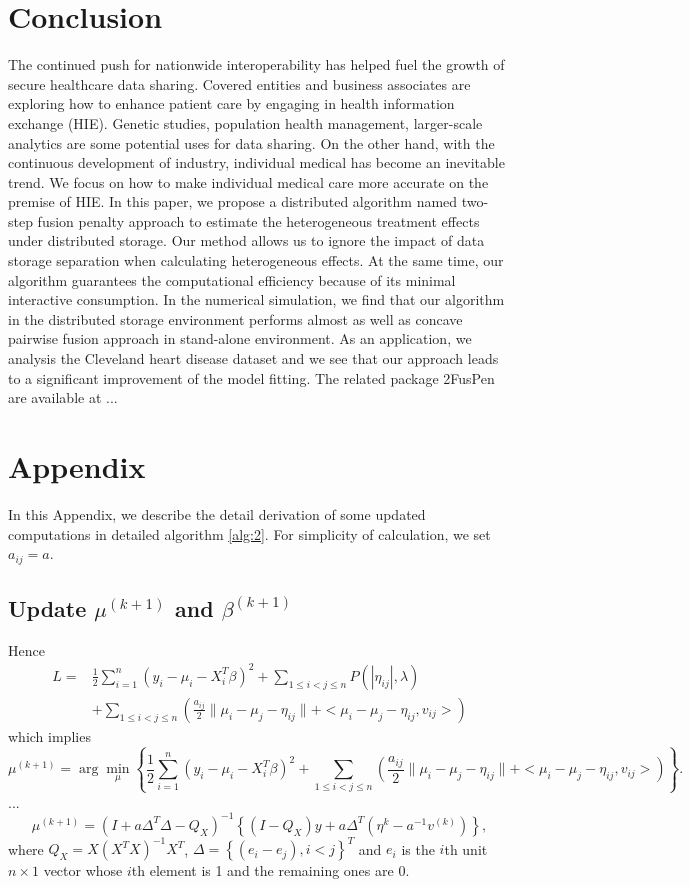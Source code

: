 \documentclass[review]{elsarticle}
\begin{document}
\section{Conclusion}
The continued push for nationwide interoperability has helped fuel the growth of secure healthcare data sharing. Covered entities and business associates are exploring how to enhance patient care by engaging in health information exchange (HIE). Genetic studies,  population health management, larger-scale analytics are some potential uses for data sharing. On the other hand, with the continuous development of industry, individual medical has become an inevitable trend. We focus on how to make individual medical care more accurate on the premise of HIE. In this paper, we propose a distributed algorithm named two-step fusion penalty approach to estimate the heterogeneous treatment effects under distributed storage. Our method allows us to ignore the impact of data storage separation when calculating heterogeneous effects. At the same time, our algorithm guarantees the computational efficiency because of its minimal interactive consumption. In the numerical simulation, we find that our algorithm in the distributed storage environment performs almost as well as concave pairwise fusion approach in stand-alone environment. As an application, we analysis the Cleveland heart disease dataset and we see that our approach leads to a significant improvement of the model fitting. The related package 2FusPen are available at ...
\section{Appendix}
In this Appendix, we describe the detail derivation of some updated computations in detailed algorithm \ref{alg:2}. For simplicity of calculation, we set $a_{ij}=a$.
\subsection{Update $\mu^{(k+1)}$ and $\beta^{(k+1)}$}
Hence 
$$
\begin{aligned}
L=&\frac{1}{2}\sum_{i=1}^n(y_i-\mu_i-X_i^T\beta)^2+\sum_{1\leq i<j\leq n}P(|\eta_{ij}|,\lambda)\\
&+\sum_{1\leq i<j\leq n}(\frac{a_{ij}}{2}\lVert \mu_i-\mu_j-\eta_{ij}\rVert+<\mu_i-\mu_j-\eta_{ij}, v_{ij}>)
\end{aligned}
$$
which implies
$$
\mu^{(k+1)}=\arg\min_{\mu}\left\{\frac{1}{2}\sum_{i=1}^n(y_i-\mu_i-X_i^T\beta)^2+\sum_{1\leq i<j\leq n}(\frac{a_{ij}}{2}\lVert \mu_i-\mu_j-\eta_{ij}\rVert+<\mu_i-\mu_j-\eta_{ij}, v_{ij}>)\right\}.
$$
...
$$
\mu^{(k+1)}=(I+a\Delta^T\Delta-Q_X)^{-1}\left\{(I-Q_X)y+a\Delta^T(\eta^{k}-a^{-1}v^{(k)})\right\},
$$
where $Q_X=X(X^TX)^{-1}X^T$, $\Delta=\left\{(e_i-e_j), i<j\right\}^T$ and $e_i$ is the $i$th unit $n\times 1$ vector whose $i$th element is 1 and the remaining ones are 0.
\end{document}
